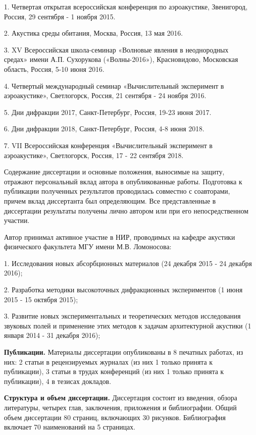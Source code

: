 1. Четвертая открытая всероссийская конференция по аэроакустике, Звенигород, Россия, 29 сентября - 1 ноября 2015.

2. Акустика среды обитания, Москва, Россия, 13 мая 2016.

3. XV Всероссийская школа-семинар «Волновые явления в неоднородных средах» имени А.П. Сухорукова («Волны-2016»), Красновидово, Московская область, Россия, 5-10 июня 2016.

4. Четвертый международный семинар «Вычислительный эксперимент в аэроакустике», Светлогорск, Россия, 21 сентября - 24 ноября 2016.

5. Дни дифракции 2017, Санкт-Петербург, Россия, 19-23 июня 2017.

6. Дни дифракции 2018, Санкт-Петербург, Россия, 4-8 июня 2018.

7. VII Всероссийская конференция «Вычислительный эксперимент в аэроакустике», Светлогорск, Россия, 17 - 22 сентября 2018.

{\contributionTXT} 
Содержание диссертации и основные положения, выносимые на защиту, отражают персональный вклад автора в опубликованные работы. Подготовка к публикации полученных результатов проводилась совместно с соавторами, причем вклад диссертанта был определяющим. Все представленные в диссертации результаты получены лично автором или при его непосредственном участии.

Автор принимал активное участие в НИР, проводимых на кафедре акустики физического факультета МГУ имени М.В. Ломоносова:

1. Исследования новых абсорбционных материалов (24 декабря 2015 - 24 декабря 2016);

2. Разработка методики высокоточных дифракционных экспериментов (1 июня 2015 - 15 октября 2015);

3. Развитие новых экспериментальных и теоретических методов исследования звуковых полей и применение этих методов к задачам архитектурной акустики (1 января 2014 - 31 декабря 2016);

\textbf{Публикации.} Материалы диссертации опубликованы в 8 печатных работах, из них: 2 статьи в рецензируемых журналах (из них 1 только принята к публикации), 3 статьи в трудах конференций (из них 1 только принята к публикации), 4 в тезисах докладов.

\textbf{Структура и объем диссертации.} Диссертация состоит из введения, обзора литературы, четырех глав, заключения, приложения и библиографии. Общий объем диссертации 80 страниц, включающих 30 рисунков. Библиография включает 70 наименований на 5 страницах.

